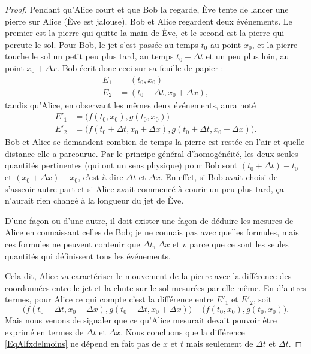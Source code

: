 \begin{proof}
	Pendant qu'Alice court et que Bob la regarde, Ève tente de lancer une pierre sur Alice (Ève est jalouse). Bob et Alice regardent deux événements. Le premier est la pierre qui quitte la main de Ève, et le second est la pierre qui percute le sol. Pour Bob, le jet s'est passée au temps \( t_0\) au point \( x_0\), et la pierre touche le sol un petit peu plus tard, au temps \( t_0+\Delta t\) et un peu plus loin, au point \( x_0+\Delta x\). Bob écrit donc ceci sur sa feuille de papier :
	\[
		\begin{split}
			E_1&=(t_0,x_0)\\
			E_2&=(t_0+\Delta t,x_0+\Delta x),
		\end{split}
	\]
	tandis qu'Alice, en observant les mêmes deux événements, aura noté
	\[
		\begin{split}
			E'_1&=\big( f(t_0,x_0),g(t_0,x_0) \big) \\
			E'_2&=\big( f(t_0+\Delta t,x_0+\Delta x), g(t_0+\Delta t,x_0+\Delta x) \big).
		\end{split}
	\]
	Bob et Alice se demandent combien de temps la pierre est restée en l'air et quelle distance elle a parcourue. Par le principe général d'homogénéité, les deux seules quantités pertinentes (qui ont un sens physique) pour Bob sont \( (t_0+\Delta t)-t_0\) et \( (x_0+\Delta x)-x_0\), c'est-à-dire \( \Delta t\) et \( \Delta x\). En effet, si Bob avait choisi de s'asseoir autre part et si Alice avait commencé à courir un peu plus tard, ça n'aurait rien changé à la longueur du jet de Ève.

	D'une façon ou d'une autre, il doit exister une façon de déduire les mesures de Alice en connaissant celles de Bob; je ne connais pas avec quelles formules, mais ces formules ne peuvent contenir que \( \Delta t\), \( \Delta x\) et \( v\) parce que ce sont les seules quantités qui définissent tous les événements.

	Cela dit, Alice va caractériser le mouvement de la pierre avec la différence des coordonnées entre le jet et la chute sur le sol mesurées par elle-même. En d'autres termes, pour Alice ce qui compte c'est la différence entre \( E'_1\) et \( E'_2\), soit
	\begin{equation}	\label{EqAlfxdelmoins}
		\big( f(t_0+\Delta t,x_0+\Delta x), g(t_0+\Delta t,x_0+\Delta x) \big)-\big( f(t_0,x_0),g(t_0,x_0) \big).
	\end{equation}
	Mais nous venons de signaler que ce qu'Alice mesurait devait pouvoir être exprimé en termes de \( \Delta t\) et \( \Delta x\). Nous concluons que la différence \eqref{EqAlfxdelmoins} ne dépend en fait pas de \( x\) et \( t\) mais seulement de \( \Delta t\) et \( \Delta t\).


\end{proof}
